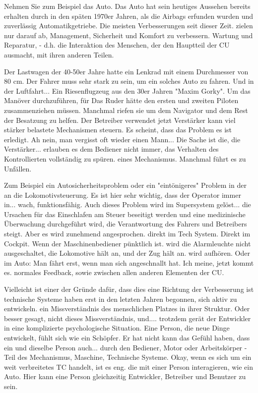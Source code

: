 \documentclass[11pt,a4paper]{article}
\begin{document}
Nehmen Sie zum Beispiel das Auto. Das Auto hat sein heutiges Aussehen bereits erhalten durch
in den späten 1970er Jahren, als die Airbags erfunden wurden und zuverlässig
Automatikgetriebe. Die meisten Verbesserungen seit dieser Zeit.
zielen nur darauf ab, Management, Sicherheit und Komfort zu verbessern.
Wartung und Reparatur, - d.h. die Interaktion des Menschen, der den Hauptteil der CU ausmacht,
mit ihren anderen Teilen.

Der Lastwagen der 40-50er Jahre hatte ein Lenkrad mit einem Durchmesser von 80 cm. Der Fahrer muss
sehr stark zu sein, um ein solches Auto zu fahren. Und in der Luftfahrt...
Ein Riesenflugzeug aus den 30er Jahren "Maxim Gorky". Um das Manöver durchzuführen, für
Das Ruder hätte den ersten und zweiten Piloten zusammenziehen müssen. Manchmal riefen sie
um dem Navigator und dem Rest der Besatzung zu helfen. Der Betreiber verwendet jetzt Verstärker
kann viel stärker belastete Mechanismen steuern. Es scheint, dass das Problem
es ist erledigt. Ah nein, man vergisst oft wieder einen Mann... Die Sache ist die, die Verstärker...
erlauben es dem Bediener nicht immer, das Verhalten des Kontrollierten vollständig zu spüren.
eines Mechanismus. Manchmal führt es zu Unfällen.


Zum Beispiel ein Autosicherheitsproblem oder ein "eintönigeres" Problem in der
an die Lokomotivsteuerung. Es ist hier sehr wichtig, dass der Operator immer in...
wach, funktionsfähig. Auch dieses Problem wird im Supersystem gelöst...
die Ursachen für das Einschlafen am Steuer beseitigt werden und eine medizinische Überwachung durchgeführt wird,
die Verantwortung des Fahrers und Betreibers steigt. Aber es wird zunehmend angesprochen.
direkt im Tech System. Direkt im Cockpit. Wenn der Maschinenbediener pünktlich ist.
wird die Alarmleuchte nicht ausgeschaltet, die Lokomotive hält an, und der Zug hält an.
wird aufhören. Oder im Auto: Man fährt erst, wenn man sich angeschnallt hat. Ich meine, jetzt kommt es.
normales Feedback, sowie zwischen allen anderen Elementen der CU.


Vielleicht ist einer der Gründe dafür, dass dies eine Richtung der Verbesserung ist
technische Systeme haben erst in den letzten Jahren begonnen, sich aktiv zu entwickeln.
ein Missverständnis des menschlichen Platzes in ihrer Struktur. Oder besser gesagt, nicht dieses Missverständnis,
und.... trotzdem gerät der Entwickler in eine komplizierte psychologische
Situation. Eine Person, die neue Dinge entwickelt, fühlt sich wie ein Schöpfer. Er hat nicht
kann das Gefühl haben, dass ein und dieselbe Person auch...
durch den Bediener, Motor oder Arbeitskörper - Teil des Mechanismus, Maschine,
Technische Systeme. Okay, wenn es sich um ein weit verbreitetes TC handelt, ist es eng.
die mit einer Person interagieren, wie ein Auto. Hier kann eine Person
gleichzeitig Entwickler, Betreiber und Benutzer zu sein.
\end{document}
